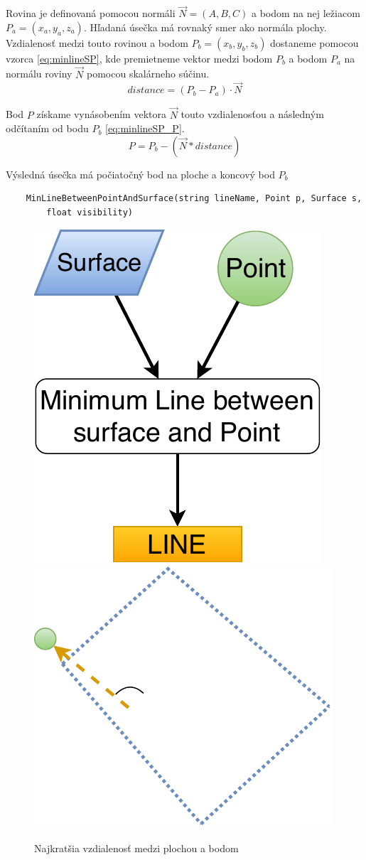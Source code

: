 Rovina je definovaná pomocou normáli $\overrightarrow{N}=(A, B, C)$ a bodom na nej ležiacom $P_a=(x_a,y_a,z_a)$.
Hľadaná úsečka má rovnaký smer ako normála plochy.
Vzdialenosť medzi touto rovinou a bodom $P_b=(x_b,y_b,z_b)$ dostaneme pomocou vzorca \ref{eq:minlineSP}, kde premietneme vektor medzi bodom $P_b$ a bodom $P_a$ na normálu roviny $\overrightarrow{N}$ pomocou skalárneho súčinu. 
\begin{equation}
 distance = (P_b - P_a) \cdot \overrightarrow{N}
    \label{eq:minlineSP}
\end{equation}

Bod $P$ získame vynásobením vektora $\overrightarrow{N}$ touto vzdialenosťou a následným odčítaním od bodu $P_b$ \ref{eq:minlineSP_P}.
\begin{equation}
 P = P_b - (\overrightarrow{N} * distance)
    \label{eq:minlineSP_P}
\end{equation}

Výsledná úsečka má počiatočný bod na ploche a koncový bod $P_b$ 





\begin{lstlisting}
	MinLineBetweenPointAndSurface(string lineName, Point p, Surface s,
	    float visibility)
\end{lstlisting}

\begin{figure}[H]
	\centering
	\includegraphics[height=0.3\textwidth]{obrazky-figures/Diagram/Line/DP Navrh operacii-1D - LineMinSP.pdf}
	\includegraphics[height=0.3\textwidth]{obrazky-figures/Diagram/Draw/2Line/DP Navrh operacii-1D - LineMinSP.pdf}
	\caption{Najkratšia vzdialenosť medzi plochou a bodom}
	\label{fig:1}
\end{figure}


